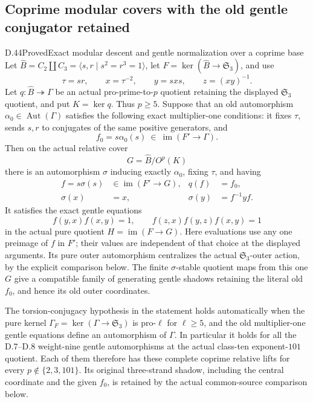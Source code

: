 \subsection{Coprime modular covers with the old gentle conjugator retained}

\begin{statement}{D.44}{Proved}{Exact modular descent and gentle normalization over a coprime base}
Let
\(\widehat B=C_2\amalg C_3=\langle s,r\mid s^2=r^3=1\rangle\),
let
\(F=\ker(\widehat B\to\mathfrak S_3)\),
and use
\[
 \tau=sr,\qquad x=\tau^{-2},\qquad y=sxs,\qquad z=(xy)^{-1}.
 \tag{D.44.1}
\]
Let \(q:\widehat B\twoheadrightarrow\Gamma\) be an actual
pro-prime-to-\(p\) quotient retaining the displayed
\(\mathfrak S_3\) quotient, and put \(K=\ker q\).
Thus \(p\geq5\).
Suppose that an old automorphism
\(\alpha_0\in\operatorname{Aut}(\Gamma)\) satisfies
the following exact multiplier-one conditions:
it fixes \(\tau\), sends \(s,r\) to conjugates of
the same positive generators, and
\[
             f_0=s\alpha_0(s)
                   \ \in\ \operatorname{im}(F'\to\Gamma).
 \tag{D.44.2}
\]
Then on the actual relative cover
\[
                    G=\widehat B/O^p(K)
 \tag{D.44.3}
\]
there is an automorphism \(\sigma\) inducing exactly
\(\alpha_0\), fixing \(\tau\), and having
\[
 \begin{aligned}
 f=s\sigma(s)&\in\operatorname{im}(F'\to G),&
 q(f)&=f_0,\\
 \sigma(x)&=x,&
 \sigma(y)&=f^{-1}yf.
 \end{aligned}
 \tag{D.44.4}
\]
It satisfies the exact gentle equations
\[
       f(y,x)f(x,y)=1,\qquad
       f(z,x)f(y,z)f(x,y)=1
 \tag{D.44.5}
\]
in the actual pure quotient \(H=\operatorname{im}(F\to G)\).
Here evaluations use any one preimage of \(f\) in \(F'\);
their values are independent of that choice at the displayed
arguments.
Its pure outer automorphism centralizes the actual
\(\mathfrak S_3\)-outer action, by the explicit
comparison below.
The finite \(\sigma\)-stable quotient maps from this one \(G\) give a
compatible family of generating gentle shadows retaining
the literal old \(f_0\), and hence its old outer coordinates.

The torsion-conjugacy hypothesis in the statement holds
automatically when the pure kernel
\(\Gamma_F=\ker(\Gamma\to\mathfrak S_3)\)
is pro-\(\ell\) for \(\ell\geq5\), and the old
multiplier-one gentle equations define an automorphism
of \(\Gamma\).
In particular it holds for all the D.7--D.8
weight-nine gentle automorphisms at the actual
class-ten exponent-\(101\) quotient.
Each of them therefore has these complete coprime
relative lifts for every \(p\notin\{2,3,101\}\).
Its original three-strand shadow, including the
central coordinate and the given \(f_0\), is retained
by the actual common-source comparison below.
\end{statement}


